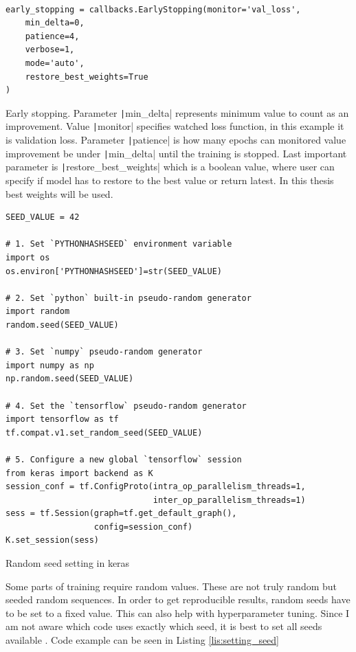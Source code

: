 \documentclass[thesis=B,english]{FITthesis}[2019/12/23]
\begin{document}
\begin{listing}
    \begin{verbatim}
    
early_stopping = callbacks.EarlyStopping(monitor='val_loss',
    min_delta=0,
    patience=4,
    verbose=1,
    mode='auto',
    restore_best_weights=True
)
    \end{verbatim}
    \caption[Early stopping]{Early stopping. Parameter \texttt|min_delta| represents minimum value to count as an improvement. Value \texttt|monitor| specifies watched loss function, in this example it is validation loss. Parameter \texttt|patience| is how many epochs can monitored value improvement be under \texttt|min_delta| until the training is stopped. Last important parameter is \texttt|restore_best_weights| which is a boolean value, where user can specify if model has to restore to the best value or return latest. In this thesis best weights will be used.}
    \label{lis:early_stopping}
\end{listing}

\begin{listing}
    \begin{verbatim}
SEED_VALUE = 42

# 1. Set `PYTHONHASHSEED` environment variable 
import os
os.environ['PYTHONHASHSEED']=str(SEED_VALUE)

# 2. Set `python` built-in pseudo-random generator 
import random
random.seed(SEED_VALUE)

# 3. Set `numpy` pseudo-random generator 
import numpy as np
np.random.seed(SEED_VALUE)

# 4. Set the `tensorflow` pseudo-random generator 
import tensorflow as tf
tf.compat.v1.set_random_seed(SEED_VALUE)

# 5. Configure a new global `tensorflow` session
from keras import backend as K
session_conf = tf.ConfigProto(intra_op_parallelism_threads=1,
                              inter_op_parallelism_threads=1)
sess = tf.Session(graph=tf.get_default_graph(),
                  config=session_conf)
K.set_session(sess)
    \end{verbatim}
    \caption[Random seed setting in keras]{Random seed setting in keras \cite{keras_random_seed}}
    \label{lis:setting_seed}
\end{listing}

Some parts of training require random values. These are not truly random but seeded random sequences. In order to get reproducible results, random seeds have to be set to a fixed value. This can also help with hyperparameter tuning. Since I am not aware which code uses exactly which seed, it is best to set all seeds available \cite{fix_random_values}. Code example can be seen in Listing \ref{lis:setting_seed} 
\end{document}

